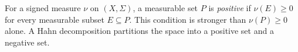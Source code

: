 
For a signed measure $\nu$ on $(X,\Sigma)$, a measurable set $P$ is \emph{positive} if $\nu(E)\ge0$ for every measurable subset $E\subseteq P$. This condition is stronger than $\nu(P)\ge0$ alone. A Hahn decomposition partitions the space into a positive set and a negative set.
